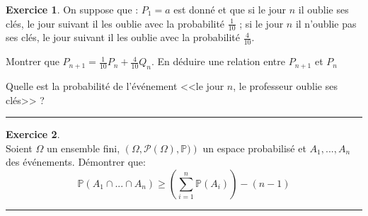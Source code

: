 \documentclass[a4paper,10pt]{article}
\theoremstyle{definition}
\theoremstyle{definition}
\newtheorem{exo}{Exercice}
\newcommand{\p}{\mathbb{P}}
\begin{document}
\begin{minipage}{1\linewidth}
\begin{minipage}[t]{0.48\linewidth}
\begin{exo}
		On suppose que : $P_{1}=a$ est donné et que si le jour $n$ il oublie ses clés, 
		le jour suivant il les oublie avec la probabilité $\frac{1}{10}$ ; 
		si le jour $n$ il n'oublie pas ses clés, le jour suivant il les oublie
		avec la probabilité $\frac{4}{10}$.
		
		Montrer que $P_{n+1}=\frac{1}{10}P_{n}+\frac{4}{10}Q_{n}$.
		En déduire une relation entre $P_{n+1}$ et $P_{n}$
		
		Quelle est la probabilité de l'événement <<le jour $n$, le professeur oublie ses clés>> ?
			
			\centering
			\rule{1\linewidth}{0.6pt}
		\end{exo}
	
	\begin{exo} \quad\\%
		Soient $\Omega$ un ensemble fini, $\left( \Omega, \mathcal{P}(\Omega),\p) \right)$ un espace probabilisé et $A_1,...,A_n$ des événements. Démontrer que:
		$$\p(A_1\cap...\cap A_n) \geq \left(\sum_{i=1}^{n} \p(A_i)\right) - (n-1)$$ 
		
		\centering
		\rule{1\linewidth}{0.6pt}
	\end{exo}	
	\end{minipage}
\end{minipage}
	


\newpage
\end{document}
